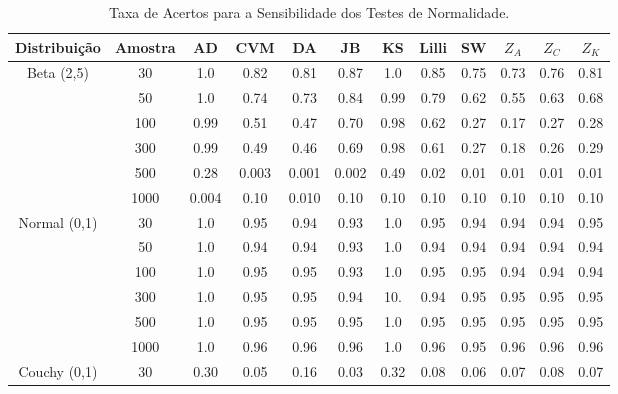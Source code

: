 \documentclass[a4paper,11pt]{article} %
\begin{document}
\begin{table}[H]
    \centering
    \caption{Taxa de Acertos para a Sensibilidade dos Testes de Normalidade.}
    \begin{tabular}{c|c|c|c|c|c|c|c|c|c|c|c}
    \hline \hline
Distribuição              & Amostra &   AD  & CVM  &  DA   & JB   &  KS   & Lilli &  SW  & $Z_{A}$ & $Z_{C}$ & $Z_{K}$ \\
    \hline
\multirow{6}{*}{Beta (2,5)} 
                          & 30      & 1.0   & 0.82 & 0.81  & 0.87 &  1.0  &  0.85  &  0.75 &  0.73  & 0.76   & 0.81   \\
                          & 50      & 1.0   & 0.74 & 0.73  & 0.84 &  0.99 &  0.79  &  0.62 &  0.55  & 0.63   & 0.68   \\
                          & 100     & 0.99  & 0.51 & 0.47  & 0.70 &  0.98 &  0.62  &  0.27 &  0.17  & 0.27   & 0.28   \\
                          & 300     & 0.99  & 0.49 & 0.46  & 0.69 &  0.98 &  0.61  &  0.27 &  0.18  & 0.26   & 0.29    \\
                          & 500     & 0.28  & 0.003 & 0.001  & 0.002 & 0.49  & 0.02 & 0.01  & 0.01  & 0.01   & 0.01     \\
                          & 1000    & 0.004 & 0.10  & 0.010  & 0.10 & 0.10  & 0.10  & 0.10  & 0.10  & 0.10  & 0.10       \\
                          \hline\hline
\multirow{6}{*}{Normal (0,1)}   
                          & 30      & 1.0  & 0.95  & 0.94 & 0.93 &  1.0 & 0.95  & 0.94  &  0.94  &  0.94  & 0.95   \\
                          &  50     & 1.0  & 0.94  & 0.94 & 0.93 &  1.0 & 0.94  & 0.94  &  0.94  &  0.94  & 0.94    \\
                          & 100     & 1.0  & 0.95  & 0.95 & 0.93 &  1.0 & 0.95  & 0.95  &  0.94  &  0.94  & 0.94    \\
                          & 300     & 1.0  & 0.95  & 0.95 & 0.94 &  10. & 0.94  & 0.95  &  0.95  &  0.95  & 0.95     \\
                         & 500    & 1.0   & 0.95  &  0.95 & 0.95 &  1.0  &  0.95  & 0.95  &  0.95  &  0.95  & 0.95    \\
               & 1000   & 1.0   & 0.96  &  0.96 & 0.96 &  1.0  &  0.96  & 0.95  &  0.96  &  0.96  & 0.96     \\ 
                          \hline\hline
\multirow{6}{*}{Couchy (0,1)}     
                         & 30     &  0.30 & 0.05  &  0.16 & 0.03 & 0.32  & 0.08  & 0.06  & 0.07   & 0.08   & 0.07    \\

\end{tabular}
\end{table}
\end{document}
